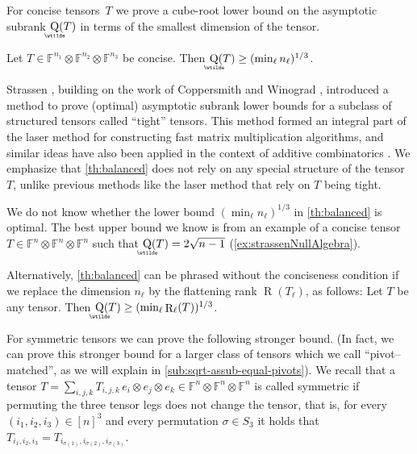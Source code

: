 \documentclass{daj}
\DeclareMathOperator{\asympsubrank}{\underaccent{\wtilde}{Q}}
\DeclareMathOperator{\tensorrank}{R}
\newcommand{\FF}{\mathbb{F}}
\begin{document}
For concise tensors~$T$ we prove a cube-root lower bound on the asymptotic subrank $\asympsubrank(T)$ in terms of the smallest dimension of the tensor.

\begin{theorem}\label{th:balanced}
Let $T \in \FF^{n_1} \otimes \FF^{n_2} \otimes \FF^{n_3}$ be concise. Then %
$\asympsubrank(T) \geq (\min_\ell n_\ell)^{1/3}$.
\end{theorem}

Strassen \cite{strassen1991degeneration}, building on the work of Coppersmith and Winograd \cite{MR1056627}, introduced a method to prove (optimal) asymptotic subrank lower bounds for a subclass of structured tensors called ``tight'' tensors. This method formed an integral part of the laser method for constructing fast matrix multiplication algorithms, and similar ideas have also been applied in the context of additive combinatorics \cite{kleinberg2018growth}.
We emphasize that \autoref{th:balanced} does not rely on any special structure of the tensor~$T$, unlike previous methods like the laser method that rely on $T$ being tight.

%
We do not know whether the lower bound $(\min_\ell n_\ell)^{1/3}$ in \autoref{th:balanced} is optimal. 
The best upper bound we know is from an example of a concise tensor $T \in \FF^n \otimes \FF^n \otimes \FF^n$ such that $\asympsubrank(T)=2\sqrt{n-1}$ (\autoref{ex:strassenNullAlgebra}). %

Alternatively, \autoref{th:balanced} can be phrased without the conciseness condition if we replace the dimension $n_\ell$ by the flattening rank $\tensorrank(T_\ell)$, as follows: Let $T$ be any tensor. Then $\asympsubrank(T) \geq (\min_\ell \tensorrank_\ell(T))^{1/3}$.

%
%
%

%

For symmetric tensors we can prove the following stronger bound. (In fact, we can prove this stronger bound for a larger class of tensors which we call ``pivot--matched'', as we will explain in \autoref{sub:sqrt-assub-equal-pivots}). %
We recall that a tensor $T=\sum_{i,j,k}T_{i,j,k}\, e_i\otimes e_j \otimes e_k \in \FF^{n} \otimes \FF^{n} \otimes \FF^{n}$ is called symmetric if permuting the three tensor legs does not change the tensor, that is, for every $(i_1,i_2,i_3)\in [n]^3$ and  every permutation  $\sigma\in S_3$ it holds that $T_{i_1,i_2,i_3}=T_{i_{\sigma(1)},i_{\sigma(2)},i_{\sigma(3)}}$. 
\end{document}
